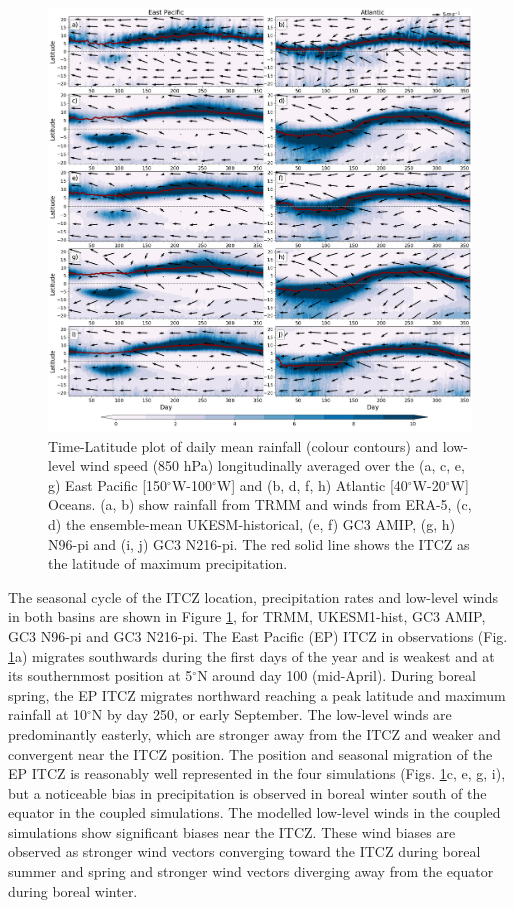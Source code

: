 \begin{figure}[t!]
\centering
 \includegraphics[width=\linewidth]{figures/fig3_p2_v3.png}
\caption{ Time-Latitude plot of daily mean rainfall (colour contours) and low-level wind speed (850 hPa) longitudinally averaged over the (a, c, e, g) East Pacific [150$^\circ$W-100$^\circ$W] and (b, d, f, h) Atlantic [40$^\circ$W-20$^\circ$W] Oceans. (a, b) show rainfall from TRMM and winds from ERA-5, (c, d) the ensemble-mean UKESM-historical, (e, f) GC3 AMIP, (g, h) N96-pi and (i, j) GC3 N216-pi. The red solid line shows the ITCZ as the latitude of maximum precipitation.  }
\label{fig:4}
\end{figure}


The seasonal cycle of the ITCZ location, precipitation rates and low-level winds in both basins are shown in Figure \ref{fig:4}, for TRMM, UKESM1-hist, GC3 AMIP, GC3 N96-pi and GC3 N216-pi.   %
The East Pacific (EP) ITCZ in observations (Fig. \ref{fig:4}a) migrates southwards during the first days of the year and is weakest and at its southernmost position at 5$^\circ$N around day 100 (mid-April).  
During boreal spring, the EP ITCZ migrates northward reaching a peak latitude and maximum rainfall at 10$^\circ$N by day 250, or early September.
The low-level winds are predominantly easterly, which are stronger away from the ITCZ and weaker and convergent near the ITCZ position.
The position and seasonal migration of the EP ITCZ is reasonably well represented in the four simulations (Figs. \ref{fig:4}c, e, g, i), but a noticeable bias in precipitation is observed in  boreal winter south of the equator in the coupled simulations. The modelled  low-level winds in the coupled simulations show significant biases near the ITCZ.
These wind biases are observed as stronger wind vectors converging toward the ITCZ during boreal summer and spring and stronger wind vectors diverging away from the equator during boreal winter. 

